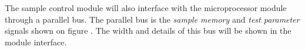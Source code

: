 The sample control module will also interface with the microprocessor module through a parallel bus. The parallel bus is the \textit{sample memory} and \textit{test parameter} signals shown on figure . The width and details of this bus will be shown in the module interface. 